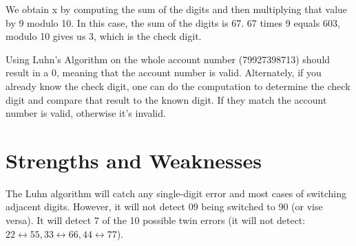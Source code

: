 \documentclass{article}
\begin{document}
We obtain x by computing the sum of the digits and then multiplying that value
by 9 modulo 10. In this case, the sum of the digits is 67. 67 times 9 equals
603, modulo 10 gives us 3, which is the check digit.

Using Luhn's Algorithm on the whole account number (79927398713) should result
in a 0, meaning that the account number is valid. Alternately,
if you already know the check digit, one can do the computation to determine
the check digit and compare that result to the known digit. If they match the
account number is valid, otherwise it's invalid.

\section{Strengths and Weaknesses}
The Luhn algorithm will catch any single-digit error and most cases of switching
adjacent digits. However, it will not detect 09 being switched to 90 (or vise versa).
It will detect 7 of the 10 possible twin errors (it will not detect: $22 \leftrightarrow 55,
33 \leftrightarrow 66, 44 \leftrightarrow 77$).
\end{document}
